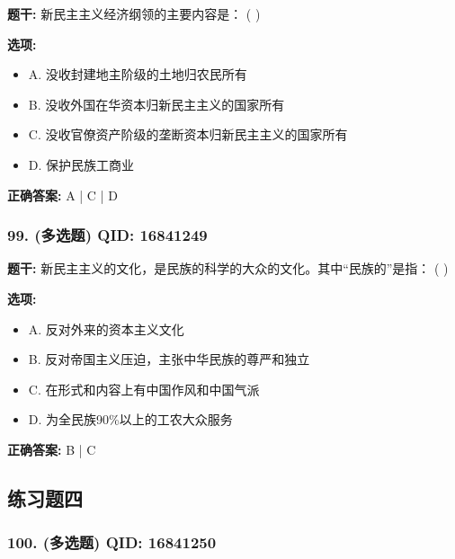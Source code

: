 \documentclass[12pt,UTF8]{ctexart}
\begin{document}
\textbf{题干:}
新民主主义经济纲领的主要内容是： ( )

\textbf{选项:}
\begin{itemize}[leftmargin=*]

  \item A. 没收封建地主阶级的土地归农民所有

  \item B. 没收外国在华资本归新民主主义的国家所有

  \item C. 没收官僚资产阶级的垄断资本归新民主主义的国家所有

  \item D. 保护民族工商业

\end{itemize}

\textbf{正确答案:}
A | C | D

\vspace{0.3em}\hrulefill\vspace{0.7em}

\subsubsection*{99. (多选题) \small QID: 16841249}

\textbf{题干:}
新民主主义的文化，是民族的科学的大众的文化。其中“民族的”是指： ( )

\textbf{选项:}
\begin{itemize}[leftmargin=*]

  \item A. 反对外来的资本主义文化

  \item B. 反对帝国主义压迫，主张中华民族的尊严和独立

  \item C. 在形式和内容上有中国作风和中国气派

  \item D. 为全民族90\%以上的工农大众服务

\end{itemize}

\textbf{正确答案:}
B | C

\vspace{0.3em}\hrulefill\vspace{0.7em}

\subsection*{练习题四}

\subsubsection*{100. (多选题) \small QID: 16841250}
\end{document}
